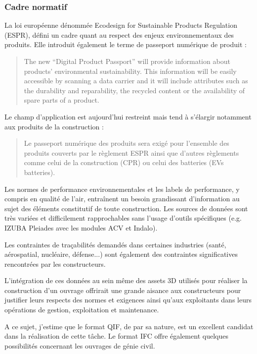 \subsubsection{Cadre normatif}

La loi européenne dénommée Ecodesign for Sustainable Products Regulation (ESPR), défini un cadre quant au respect des enjeux environnementaux des produits. 
Elle introduit également le terme de passeport numérique de produit :

\begin{quote}
    The new “Digital Product Passport” will provide information about products’ environmental sustainability. This information will be easily accessible by scanning a data carrier and it will include attributes such as the durability and reparability, the recycled content or the availability of spare parts of a product. \cite{europaEcodesignSustainable}
\end{quote}

Le champ d'application est aujourd'hui restreint mais tend à s'élargir notamment aux produits de la construction :

\begin{quote}
    Le passeport numérique des produits sera exigé pour l’ensemble des produits couverts par le règlement ESPR ainsi que d’autres règlements comme celui de la construction (CPR) ou celui des batteries (EVs batteries). \cite{PasseportNumeriqueProduits}
\end{quote}

Les normes de performance environnementales et les labels de performance, y compris en qualité de l'air, entraînent un besoin grandissant d'information au sujet des éléments constitutif de toute construction. 
Les sources de données sont très variées et difficilement rapprochables sans l'usage d'outils spécifiques (e.g. IZUBA Pleiades avec les modules ACV et Indalo). 

Les contraintes de traçabilités demandés dans certaines industries (santé, aérospatial, nucléaire, défense...) sont également des contraintes significatives rencontrées par les constructeurs.

L'intégration de ces données au sein même des assets 3D utilisés pour réaliser la construction d'un ouvrage offrirait une grande aisance aux constructeurs pour justifier leurs respects des normes et exigences ainsi qu'aux exploitants dans leurs opérations de gestion, exploitation et maintenance. 

A ce sujet, j'estime que le format QIF, de par sa nature, est un excellent candidat dans la réalisation de cette tâche. Le format IFC offre également quelques possibilités concernant les ouvrages de génie civil.
